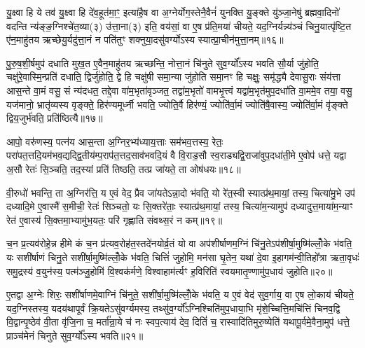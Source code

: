 यु॒क्ष्वा हि ये तव॑ यु॒क्ष्वा हि दे॑व॒हूत॑मा॒ꣳ॒ इत्या॑है॒ष वा अ॒ग्नेर्योग॒स्तेनै॒वैनं॑ युनक्ति यु॒ङ्क्ते यु॑ञ्जा॒नेषु॑ ब्रह्मवा॒दिनो॑ वदन्ति न्य॑ङ्ङ॒ग्निश्चे॑त॒व्या(३) उ॑त्ता॒ना(३) इति॒ वय॑सां॒ वा ए॒ष प्र॑ति॒मया॑ चीयते॒ यद॒ग्निर्यन्न्य॑ञ्चं चिनु॒यात्पृ॑ष्टि॒त ए॑न॒माहु॑तय ऋच्छेयु॒र्यदु॑त्ता॒नं न पति॑तुꣳ शक्नुया॒दसु॑वर्ग्यो\-ऽस्य स्यात्प्रा॒चीन॑मुत्ता॒नम्॥१६॥

पु॒रु॒ष॒शी॒र्\mbox{}षमुप॑ दधाति मुख॒त ए॒वैन॒माहु॑तय ऋच्छन्ति॒ नोत्ता॒नं चि॑नुते सुव॒र्ग्यो᳚\-ऽस्य भवति सौ॒र्या जु॑होति॒ चक्षु॑रे॒वास्मि॒न्प्रति॑ दधाति॒ द्विर्जु॑होति॒ द्वे हि चक्षु॑षी समा॒न्या जु॑होति समा॒नꣳ हि चक्षुः॒ समृ॑द्ध्यै देवासु॒राः संय॑त्ता आस॒न्ते वा॒मं वसु॒ सं न्य॑दधत॒ तद्दे॒वा वा॑म॒भृता॑वृञ्जत॒ तद्वा॑म॒भृतो॑ वामभृ॒त्त्वं यद्वा॑म॒भृत॑मुप॒दधा॑ति वा॒ममे॒व तया॒ वसु॒ यज॑मानो॒ भ्रातृ॑व्यस्य वृङ्क्ते॒ हिर॑ण्यमूर्ध्नी भवति॒ ज्योति॒र्वै हिर॑ण्यं॒ ज्योति॑र्वा॒मं ज्योति॑षै॒वास्य॒ ज्योति॑र्वा॒मं वृ॑ङ्क्ते द्विय॒जुर्भ॑वति॒ प्रति॑ष्ठित्यै॥१७॥

{\anuvakamend[{यु॒ञ्जा॒नेष्वग्ने᳚ प्रा॒चीन॑मुत्ता॒नं वा॑म॒भृत॒ञ्चतु॑र्विꣳशतिश्च॥३॥}]}

आपो॒ वरु॑णस्य॒ पत्न॑य आस॒न्ता अ॒ग्निर॒भ्य॑ध्याय॒त्ताः सम॑भव॒त्तस्य॒ रेतः॒ परा॑पत॒त्तदि॒यम॑भव॒द्यद्द्वि॒तीय॑म्प॒राप॑त॒त्तद॒सा\-व॑भवदि॒यं वै वि॒राड॒सौ स्व॒राड्यद्वि॒राजा॑वुप॒दधा॑ती॒मे ए॒वोप॑ धत्ते॒ यद्वा अ॒सौ रेतः॑ सि॒ञ्चति॒ तद॒स्यां प्रति॑ तिष्ठति॒ तत्प्र जा॑यते॒ ता ओष॑धयः॥१८॥

वी॒रुधो॑ भवन्ति॒ ता अ॒ग्निर॑त्ति॒ य ए॒वं वेद॒ प्रैव जा॑यते\-ऽन्ना॒दो भ॑वति॒ यो रे॑त॒स्वी स्यात्प्र॑थ॒मायां॒ तस्य॒ चित्या॑मु॒भे उप॑ दध्यादि॒मे ए॒वास्मै॑ स॒मीची॒ रेतः॑ सिञ्चतो॒ यः सि॒क्तरे॑ताः॒ स्यात्प्र॑थ॒मायां॒ तस्य॒ चित्या॑म॒न्यामुप॑ दध्यादुत्त॒माया॑\-म॒न्याꣳ रेत॑ ए॒वास्य॑ सि॒क्तमा॒भ्यामु॑भ॒यतः॒ परि॑ गृह्णाति संवथ्स॒रं न कम्॥१९॥

च॒न प्र॒त्यव॑रोहे॒न्न हीमे कं च॒न प्र॑त्यव॒रोह॑त॒स्तदे॑नयोर्व्र॒तं यो वा अप॑शीर्\mbox{}षाणम॒ग्निं चि॑नु॒ते\-ऽप॑शीर्\mbox{}षा॒मुष्मि॑ल्लोँ॒के भ॑वति॒ यः सशी॑र्\mbox{}षाणं चिनु॒ते सशी॑र्\mbox{}षा॒मुष्मि॑ल्लोँ॒के भ॑वति॒ चित्तिं॑ जुहोमि॒ मन॑सा घृ॒तेन॒ यथा॑ दे॒वा इ॒हागम॑न्वी॒तिहो᳚त्रा ऋता॒वृधः॑ समु॒द्रस्य॑ व॒युन॑स्य॒ पत्म॑ञ्जु॒होमि॑ वि॒श्वक॑र्मणे॒ विश्वाहाम॑र्त्यꣳ ह॒विरिति॑ स्वयमातृ॒ण्णामु॑प॒धाय॑ जुहोति॥२०॥

ए॒तद्वा अ॒ग्नेः शिरः॒ सशी॑र्\mbox{}षाणमे॒वाग्निं चि॑नुते॒ सशी॑र्\mbox{}षा॒मुष्मि॑ल्लोँ॒के भ॑वति॒ य ए॒वं वेद॑ सुव॒र्गाय॒ वा ए॒ष लो॒काय॑ चीयते॒ यद॒ग्निस्तस्य॒ यदय॑थापूर्वं क्रि॒यते\-ऽसु॑वर्ग्यमस्य॒ तथ्सु॑व॒र्ग्यो᳚\-ऽग्निश्चिति॑मुप॒धाया॒भि मृ॑शे॒च्चित्ति॒मचि॑त्तिं चिनव॒द्वि वि॒द्वान्पृ॒ष्ठेव॑ वी॒ता वृ॑जि॒ना च॒ मर्ता᳚न्रा॒ये च॑ नः स्वप॒त्याय॑ देव॒ दितिं॑ च॒ रास्वादि॑तिमुरु॒ष्येति॑ यथापू॒र्वमे॒वैना॒मुप॑ धत्ते॒ प्राञ्च॑मेनं चिनुते सुव॒र्ग्यो᳚\-ऽस्य भवति॥२१॥

